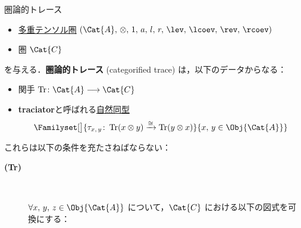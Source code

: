 \documentclass[TQFT_main]{subfiles}
\begin{document}
\begin{mydef}[label=def:cat-trace]{圏論的トレース}
    \begin{itemize}
        \item \hyperref[def:tensorfusion-cat]{多重テンソル圏} $(\Cat{A},\, \otimes,\, 1,\, a,\, l,\, r,\, \lev,\, \lcoev,\, \rev,\, \rcoev)$
        \item 圏 $\Cat{C}$
    \end{itemize}
    を与える．\textbf{圏論的トレース} (categorified trace) は，以下のデータからなる：
    \begin{itemize}
        \item 関手 $\Tr \colon \Cat{A} \lto \Cat{C}$
        \item \textbf{traciator}と呼ばれる\hyperref[def:nat]{自然同型}
        \begin{align}
            \Familyset[\big]{\tau_{x,\, y} \colon \Tr(x \otimes y) \xrightarrow{\cong} \Tr(y \otimes x)}{x,\,y \in \Obj{\Cat{A}}}
        \end{align}
    \end{itemize}
    これらは以下の条件を充たさねばならない：
    \begin{description}
        \item[\textbf{(Tr)}]　
        
        $\forall x,\, y,\, z \in \Obj{\Cat{A}}$ について，$\Cat{C}$ における以下の図式を可換にする：
        \begin{center}
        \end{center}
    \end{description}
\end{mydef}
\end{document}
